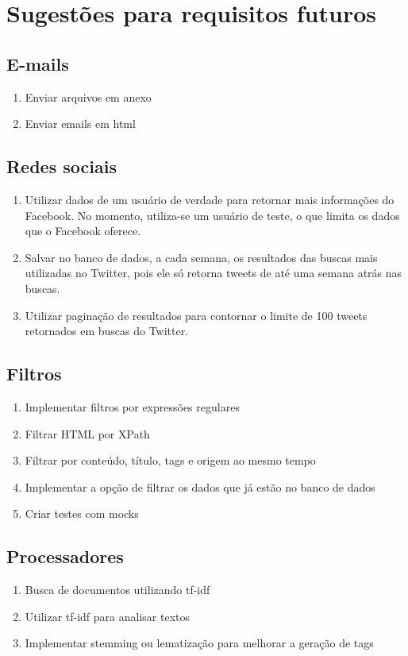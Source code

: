 \section{Sugestões para requisitos futuros}
\subsection{E-mails}
\begin{enumerate}
\item Enviar arquivos em anexo
\item Enviar emails em html
\end{enumerate}

\subsection{Redes sociais}
\begin{enumerate}
\item Utilizar dados de um usuário de verdade para retornar mais informações do Facebook. No momento, utiliza-se um usuário de teste, o que limita os dados que o Facebook oferece.
\item Salvar no banco de dados, a cada semana, os resultados das buscas mais utilizadas no Twitter, pois ele só retorna tweets de até uma semana atrás nas buscas.
\item Utilizar paginação de resultados para contornar o limite de 100 tweets retornados em buscas do Twitter.
\end{enumerate}

\subsection{Filtros}
\begin{enumerate}
\item Implementar filtros por expressões regulares
\item Filtrar HTML por XPath
\item Filtrar por conteúdo, título, tags e origem ao mesmo tempo
\item Implementar a opção de filtrar os dados que já estão no banco de dados
\item Criar testes com mocks
\end{enumerate}

\subsection{Processadores}
\begin{enumerate}
\item Busca de documentos utilizando tf-idf
\item Utilizar tf-idf para analisar textos
\item Implementar stemming ou lematização para melhorar a geração de tags
\end{enumerate}

